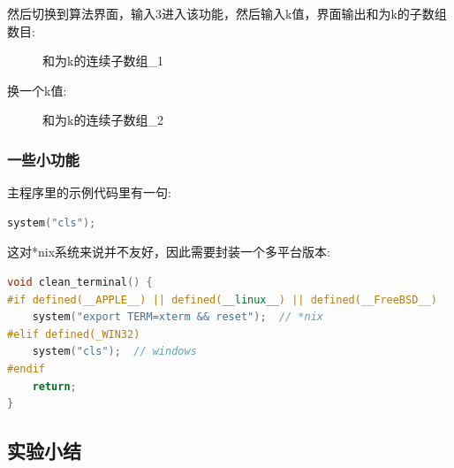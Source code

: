 \documentclass[supercite]{Experimental_Report}
\theoremstyle{definition}
\begin{document}
\clearpage
\noindent
然后切换到算法界面，输入3进入该功能，然后输入k值，界面输出和为k的子数组数目:
\begin{figure}[htbp]
	\centering
	\centering
	\caption{和为k的连续子数组\_1}
	\label{fig4-7}
\end{figure}

\noindent
换一个k值:
\begin{figure}[htbp]
	\centering
	\centering
	\caption{和为k的连续子数组\_2}
	\label{fig4-8}
\end{figure}

\newpage
\subsubsection{一些小功能}
\noindent
主程序里的示例代码里有一句:
\begin{lstlisting}[language=C++, frame=single]
system("cls");
\end{lstlisting}
这对*nix系统来说并不友好，因此需要封装一个多平台版本:
\begin{lstlisting}[language=C++, frame=single]
void clean_terminal() {
#if defined(__APPLE__) || defined(__linux__) || defined(__FreeBSD__)
	system("export TERM=xterm && reset");  // *nix
#elif defined(_WIN32)
	system("cls");  // windows
#endif
	return;
}
\end{lstlisting}

\newpage

\subsection{实验小结}
\end{document}

